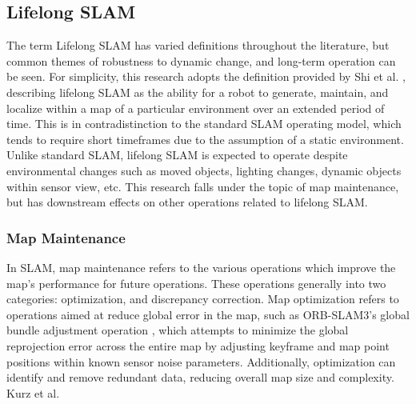 \subsection{Lifelong SLAM}

The term Lifelong SLAM has varied definitions throughout the literature, but common themes of robustness to dynamic change, and long-term operation can be seen. For simplicity, this research adopts the definition provided by Shi et al. \cite{shiAreWeReady2020}, describing lifelong SLAM as the ability for a robot to generate, maintain, and localize within a map of a particular environment over an extended period of time. This is in contradistinction to the standard SLAM operating model, which tends to require short timeframes due to the assumption of a static environment. Unlike standard SLAM, lifelong SLAM is expected to operate despite environmental changes such as moved objects, lighting changes, dynamic objects within sensor view, etc. This research falls under the topic of map maintenance, but has downstream effects on other operations related to lifelong SLAM.

\subsubsection{Map Maintenance}

In SLAM, map maintenance refers to the various operations which improve the map's performance for future operations. These operations generally into two categories: optimization, and discrepancy correction. Map optimization refers to operations aimed at reduce global error in the map, such as ORB-SLAM3's global bundle adjustment operation \cite{camposORBSLAM3AccurateOpenSource2021}, which attempts to minimize the global reprojection error across the entire map by adjusting keyframe and map point positions within known sensor noise parameters. Additionally, optimization can identify and remove redundant data, reducing overall map size and complexity. Kurz et al. 
